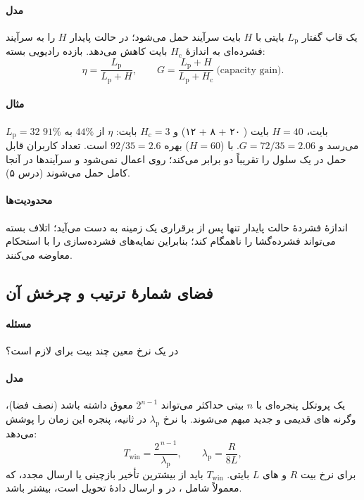 \documentclass[11pt,a4paper]{article}
\begin{document}
\paragraph{مدل} یک قاب گفتار $L_\mathrm{p}$ بایتی با $H$ بایت سرآیند  حمل می‌شود؛ 
در حالت پایدار $H$ را به سرآیند فشرده‌ای به اندازهٔ $H_\mathrm{c}$ بایت کاهش می‌دهد. بازده رادیویی بسته:
\begin{equation}\label{eq:rohc}
  \eta = \frac{L_\mathrm{p}}{L_\mathrm{p} + H}, \qquad
  G = \frac{L_\mathrm{p}+H}{L_\mathrm{p}+H_\mathrm{c}} \ \text{(capacity gain)}.
\end{equation}
\paragraph{مثال} $L_\mathrm{p} = 32$ بایت، $H = 40$ بایت ( ۲۰ +  ۸ +  ۱۲) و
$H_\mathrm{c} = 3$ بایت: $\eta$ از $44\%$ به $91\%$ می‌رسد و $G = 72/35 = 2.06$. با  ($H = 60$)
بهره $92/35 = 2.6$ است.  تعداد کاربران  قابل حمل در یک سلول را تقریباً دو برابر می‌کند؛
روی  اعمال نمی‌شود و سرآیندها در آنجا کامل حمل می‌شوند (درس ۵).
\paragraph{محدودیت‌ها} اندازهٔ فشردهٔ حالت پایدار تنها پس از برقراری یک زمینه به دست می‌آید؛ اتلاف بسته
می‌تواند فشرده‌گشا را ناهمگام کند؛ بنابراین نمایه‌های  فشرده‌سازی را با استحکام معاوضه می‌کنند.

\subsection{فضای شمارهٔ ترتیب و چرخش آن}\label{sec:sn}
\paragraph{مسئله} در یک نرخ معین چند بیت  برای  لازم است؟
\paragraph{مدل} یک پروتکل پنجره‌ای با  $n$ بیتی حداکثر می‌تواند $2^{n-1}$  معوق داشته باشد
(نصف فضا)، وگرنه های قدیمی و جدید مبهم می‌شوند. با نرخ $\lambda_\mathrm{p}$  در ثانیه،
پنجره این زمان را پوشش می‌دهد:
\begin{equation}\label{eq:snwin}
  T_{\mathrm{win}} = \frac{2^{\,n-1}}{\lambda_\mathrm{p}}, \qquad
  \lambda_\mathrm{p} = \frac{R}{8L},
\end{equation}
برای نرخ بیت $R$ و های $L$ بایتی. $T_{\mathrm{win}}$ باید از بیشترین تأخیر بازچینی یا ارسال مجدد،
که معمولاً شامل ،  در  و ارسال دادهٔ تحویل است، بیشتر باشد.
\end{document}
